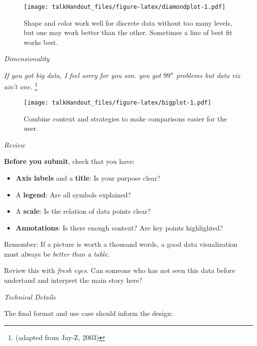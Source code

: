\documentclass{tufte-handout}
\begin{document}
\begin{figure*}
 \texttt{[image: talkHandout\_files/figure-latex/diamondplot-1.pdf]}
\caption{Shape and color work well for discrete data without too many levels, but one may work better than the other. Sometimes a line of best fit works best.}
\end{figure*}

\noindent \emph{Dimensionality}

\emph{If you got big data, I feel sorry for you son. you got \(99^{n}\)
problems but data viz ain't one.} \footnote{(adapted from Jay-Z, 2003)}

\begin{figure*}
 \texttt{[image: talkHandout\_files/figure-latex/bigplot-1.pdf]}
\caption{Combine context and strategies to make comparisons easier for the user.}
\end{figure*}

\noindent \emph{Review}

\noindent \textbf{Before you submit}, check that you have:

\begin{itemize}
\itemsep1pt\parskip0pt
\item
  \textbf{Axis labels} and a \textbf{title}: Is your purpose clear?
\item
  A \textbf{legend}: Are all symbols explained?
\item
  A \textbf{scale}: Is the relation of data points clear?
\item
  \textbf{Annotations}: Is there enough context? Are key points
  highlighted?
\end{itemize}

\noindent Remember: If a picture is worth a thousand words, a good data
visualization must always be \emph{better than a table.}

\noindent Review this with \emph{fresh eyes}. Can someone who has not
seen this data before undertand and interpret the main story here?

\noindent \emph{Technical Details}

\noindent The final format and use case should inform the design:
\end{document}
